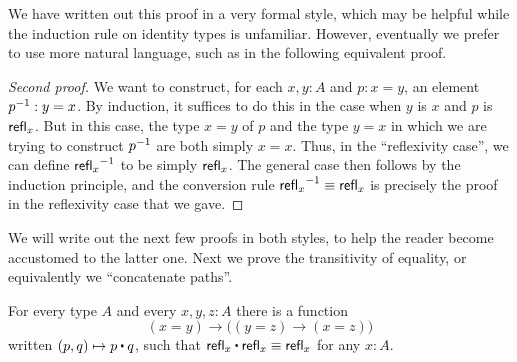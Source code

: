 We have written out this proof in a very formal style, which may be helpful while the induction rule on identity types is unfamiliar.
However, eventually we prefer to use more natural language, such as in the following equivalent proof.

\begin{proof}[Second proof]
  We want to construct, for each $x,y:A$ and $p:x=y$, an element $\mathord{{p}^{-1}}:y=x$.
  By induction, it suffices to do this in the case when $y$ is $x$ and $p$ is $\mathsf{refl}_{x}$.
  But in this case, the type $x=y$ of $p$ and the type $y=x$ in which we are trying to construct $\mathord{{p}^{-1}}$ are both simply $x=x$.
  Thus, in the ``reflexivity case'', we can define $\mathord{{\mathsf{refl}_{x}}^{-1}}$ to be simply $\mathsf{refl}_{x}$.
  The general case then follows by the induction principle, and the conversion rule $\mathord{{\mathsf{refl}_{x}}^{-1}}\equiv\mathsf{refl}_{x}$ is precisely the proof in the reflexivity case that we gave.
\end{proof}

We will write out the next few proofs in both styles, to help the reader become accustomed to the latter one.
Next we prove the transitivity of equality, or equivalently we ``concatenate paths''.

\begin{lem}\label{lem:concat}
  For every type $A$ and every $x,y,z:A$ there is a function
  \begin{equation*}
  (x= y) \to   \big((y= z)\to (x=  z)\big)
  \end{equation*}
  written $(p,q)\mapsto p\ct q$, such that $\refl{x}\ct \refl{x}\jdeq \refl{x}$ for any $x:A$.
\end{lem}

